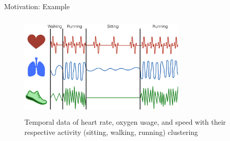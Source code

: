 \documentclass{beamer}
\begin{document}
\begin{frame}{Motivation: Example}
	\centering
	\begin{figure}
	\includegraphics[height=5cm, width=8cm]{fig1.eps}
	\vspace{.25cm}
	\captionsetup{justification=centering, labelformat=empty}
	\caption{Temporal data of heart rate, oxygen usage, and speed with their respective activity (sitting, walking, running) clustering}
	\end{figure}
\end{frame}

\end{document}
